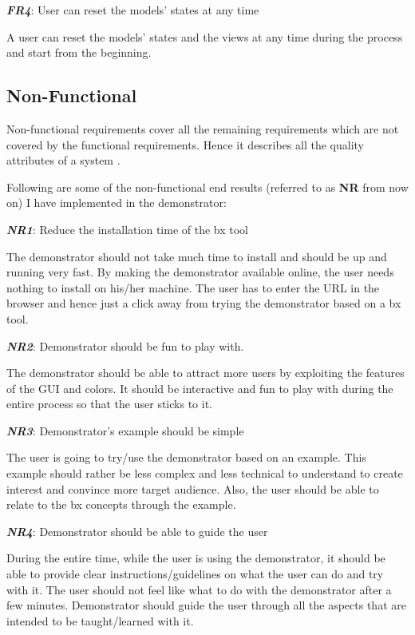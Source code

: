 \textbf{\textit{FR4}}: User can reset the models' states at any time

A user can reset the models' states and the views at any time during the process and start from the beginning.

\subsection{Non-Functional}\label{subsec:nonfunctionalreq}
Non-functional requirements cover all the remaining requirements which are not covered by the functional requirements. Hence it describes all the quality attributes of a system \cite{funcandnonfuncreq}.

Following are some of the non-functional end results (referred to as \textbf{NR} from now on) I have implemented in the demonstrator:

\textbf{\textit{NR1}}: Reduce the installation time of the bx tool

The demonstrator should not take much time to install and should be up and running very fast. By making the demonstrator available online, the user needs nothing to install on his/her machine. The user has to enter the URL in the browser and hence just a click away from trying the demonstrator based on a bx tool.

\textbf{\textit{NR2}}: Demonstrator should be fun to play with.

The demonstrator should be able to attract more users by exploiting the features of the GUI and colors. It should be interactive and fun to play with during the entire process so that the user sticks to it.

\textbf{\textit{NR3}}: Demonstrator's example should be simple

The user is going to try/use the demonstrator based on an example. This example should rather be less complex and less technical to understand to create interest and convince more target audience. Also, the user should be able to relate to the bx concepts through the example.

\textbf{\textit{NR4}}: Demonstrator should be able to guide the user

During the entire time, while the user is using the demonstrator, it should be able to provide clear instructions/guidelines on what the user can do and try with it. The user should not feel like what to do with the demonstrator after a few minutes. Demonstrator should guide the user through all the aspects that are intended to be taught/learned with it.

